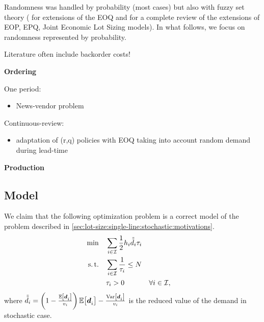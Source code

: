 Randomness was handled by probability (most cases) but also with fuzzy set theory (\eg \cite{Park1987,Lee1999,Wang2007} for extensions of the EOQ and \cite{Ziukov2015} for a complete review of the extensions of EOP, EPQ, Joint Economic Lot Sizing models). In what follows, we focus on randomness represented by probability.

Literature often include backorder costs!

\medskip

\textbf{Ordering}

One period:
\begin{itemize}
  \item News-vendor problem \cite{Edgeworth88,Arrow1951}
\end{itemize}

Continuous-review:
\begin{itemize}
  \item adaptation of (r,q) policies with EOQ taking into account random demand during lead-time \cite{Gallego1998}
\end{itemize}

\medskip

\textbf{Production}







\subsection{Model}


We claim that the following optimization problem is a correct model of the problem described in \cref{sec:lot-size:single-line:stochastic:motivations}.
\begin{subequations}\label{eq:lot-size:single-line:stochastic:unconstraint}
  \begin{align}
  \min\quad & \displaystyle\sum_{i\in\mathcal{I}} \frac{1}{2}h_i\tilde{\tilde{d}}_i\tau_i
  \label{eq:lot-size:single-line:stochastic:unconstraint:objective}
  \\
  \operatorname{s.t.}\quad  & \displaystyle\sum_{i\in\mathcal{I}} \frac{1}{\tau_i} \le N
  \label{eq:lot-size:single-line:stochastic:unconstraint:flexibility}
  \\
       & \tau_i > 0 && \forall i\in\mathcal{I},
  \label{eq:lot-size:single-line:stochastic:unconstraint:positivity}
  \end{align}
\end{subequations}
where $\tilde{\tilde{\demand}}_i=\bracket{1-\frac{\espe\sqbracket{\va\demand_i}}{\rate_i}}\espe\sqbracket{\va\demand_i} - \frac{\vari\sqbracket{\va\demand_i}}{\rate_i}$ is the reduced value of the demand in stochastic case.


